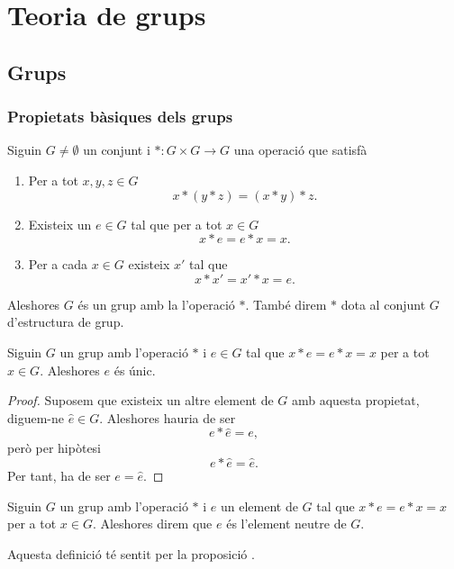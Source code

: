 \documentclass[../Apunts.tex]{subfiles}
\begin{document}
	\chapter{Teoria de grups}
	\section{Grups}
	\subsection{Propietats bàsiques dels grups}
	\begin{definition}[Grup]
		\label{def:grup}
		Siguin \(G\neq\emptyset\) un conjunt i \(\ast\colon G\times G\to G\) una operació que satisfà
		\begin{enumerate}
			\item Per a tot \(x,y,z\in G\)
			\[x\ast(y\ast z)=(x\ast y)\ast z.\]
			\item Existeix un \(e\in G\) tal que per a tot \(x\in G\)
			\[x\ast e=e\ast x=x.\]
			\item Per a cada \(x\in G\) existeix \(x'\) tal que
			\[x\ast x'=x'\ast x=e.\]
		\end{enumerate}
		Aleshores \(G\) és un grup amb la l'operació \(\ast\). També direm \(\ast\) dota al conjunt \(G\) d'estructura de grup.
	\end{definition}
	\begin{proposition}
		\label{prop:unicitat neutre del grup}
		Siguin \(G\) un grup amb l'operació \(\ast\) i \(e\in G\) tal que \(x\ast e=e\ast x=x\) per a tot \(x\in G\). Aleshores \(e\) és únic.
		\begin{proof}
			Suposem que existeix un altre element de \(G\) amb aquesta propietat, diguem-ne \(\hat{e}\in G\). Aleshores hauria de ser
			\[e\ast\hat{e}=e,\]
			però per hipòtesi
			\[e\ast\hat{e}=\hat{e}.\]
			Per tant, ha de ser \(e=\hat{e}\).
		\end{proof}
	\end{proposition}
	\begin{definition}
		\label{def:l'element neutre del grup}
		Siguin \(G\) un grup amb l'operació \(\ast\) i \(e\) un element de \(G\) tal que \(x\ast e=e\ast x=x\) per a tot \(x\in G\). Aleshores direm que \(e\) és l'element neutre de \(G\).
		
		Aquesta definició té sentit per la proposició .
	\end{definition}
\end{document}
